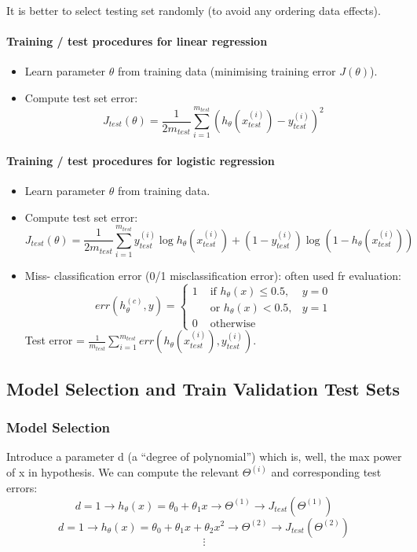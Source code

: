 \documentclass{scrartcl}
\begin{document}
It is better to select testing set randomly (to avoid any ordering
data effects).

\paragraph{Training / test procedures for linear regression}
\label{sec:10-2-1}
\begin{itemize}
\item Learn parameter $\theta$ from training data (minimising training
  error $J(\theta)$).
\item Compute test set error:
  \[J_{test}(\theta) = \frac{1}{2m_{test}}\sum
  \limits_{i=1}^{m_{test}} \left(h_\theta(x_{test}^{(i)}) -
    y_{test}^{(i)} \right)^2 \]
\end{itemize}

\paragraph{Training / test procedures for logistic regression}
\label{sec:10-2-2}
\begin{itemize}
\item Learn parameter $\theta$ from training data.
\item Compute test set error:
  \[J_{test}(\theta) = \frac{1}{2m_{test}}\sum
  \limits_{i=1}^{m_{test}} y_{test}^{(i)} \log
  h_\theta(x_{test}^{(i)}) + (1 - y_{test}^{(i)}) \log (1 - h_\theta
  (x_{test}^{(i)})) \]
\item Miss- classification error (0/1 misclassification error): often
  used fr evaluation: \[ err(h_\theta^{(c)}, y) =
  \left\{ \begin{array}
      {lll} 1 & \textrm{ if } h_\theta(x) \leq 0.5, & y = 0  \\
      & \textrm{ or } h_\theta(x) < 0.5, & y = 1  \\
      0 & \textrm{ otherwise } &
    \end{array} \right.\]
  Test error = $\frac{1}{m_{test}} \sum \limits_{i=1}^{m_{test}}
  err(h_\theta(x_{test}^{(i)}), y_{test}^{(i)})$.
\end{itemize}

\subsection{Model Selection and Train Validation Test Sets}
\label{sec:10-3}

\subsubsection{Model Selection}
Introduce a parameter d (a ``degree of polynomial'') which is, well,
the max power of x in hypothesis. We can compute the relevant
$\Theta^{(i)}$ and corresponding test errors:
\[ d = 1 \rightarrow h_\theta(x) = \theta_0 + \theta_1x \rightarrow
\Theta^{(1)} \rightarrow J_{test}(\Theta^{(1)}) \]
\[ d = 1 \rightarrow h_\theta(x) = \theta_0 + \theta_1x + \theta_2x^2
\rightarrow \Theta^{(2)} \rightarrow J_{test}(\Theta^{(2)}) \]
\[ \vdots\]
\end{document}
